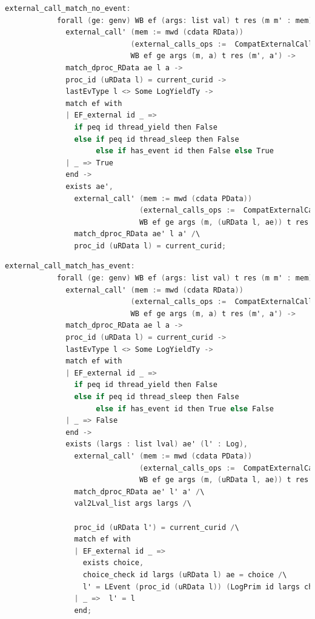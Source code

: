 \begin{lstlisting}[language=C]
          external_call_match_no_event:
            forall (ge: genv) WB ef (args: list val) t res (m m' : mem) (a a': RData) ae l,
              external_call' (mem := mwd (cdata RData)) 
                             (external_calls_ops :=  CompatExternalCalls.compatlayer_extcall_ops (phthread <@$\oplus$@>  L64))
                             WB ef ge args (m, a) t res (m', a') ->
              match_dproc_RData ae l a ->
              proc_id (uRData l) = current_curid ->
              lastEvType l <> Some LogYieldTy ->
              match ef with
              | EF_external id _ => 
                if peq id thread_yield then False
                else if peq id thread_sleep then False
                     else if has_event id then False else True
              | _ => True
              end -> 
              exists ae',
                external_call' (mem := mwd (cdata PData)) 
                               (external_calls_ops :=  CompatExternalCalls.compatlayer_extcall_ops (LH <@$\oplus$@>  L64))
                               WB ef ge args (m, (uRData l, ae)) t res (m', (uRData l, ae')) /\
                match_dproc_RData ae' l a' /\
                proc_id (uRData l) = current_curid;
\end{lstlisting}

\begin{lstlisting}[language=C]
          external_call_match_has_event:
            forall (ge: genv) WB ef (args: list val) t res (m m' : mem) (a a': RData) ae l,
              external_call' (mem := mwd (cdata RData)) 
                             (external_calls_ops :=  CompatExternalCalls.compatlayer_extcall_ops (phthread <@$\oplus$@>  L64))
                             WB ef ge args (m, a) t res (m', a') ->
              match_dproc_RData ae l a ->
              proc_id (uRData l) = current_curid ->
              lastEvType l <> Some LogYieldTy ->
              match ef with
              | EF_external id _ => 
                if peq id thread_yield then False
                else if peq id thread_sleep then False
                     else if has_event id then True else False
              | _ => False
              end -> 
              exists (largs : list lval) ae' (l' : Log),
                external_call' (mem := mwd (cdata PData)) 
                               (external_calls_ops :=  CompatExternalCalls.compatlayer_extcall_ops (LH <@$\oplus$@>  L64))
                               WB ef ge args (m, (uRData l, ae)) t res (m', (uRData l', ae')) /\
                match_dproc_RData ae' l' a' /\
                val2Lval_list args largs /\
                
                proc_id (uRData l') = current_curid /\
                match ef with 
                | EF_external id _ =>
                  exists choice,
                  choice_check id largs (uRData l) ae = choice /\
                  l' = LEvent (proc_id (uRData l)) (LogPrim id largs choice (snap_func ae)) :: l
                | _ =>  l' = l
                end;
\end{lstlisting}

